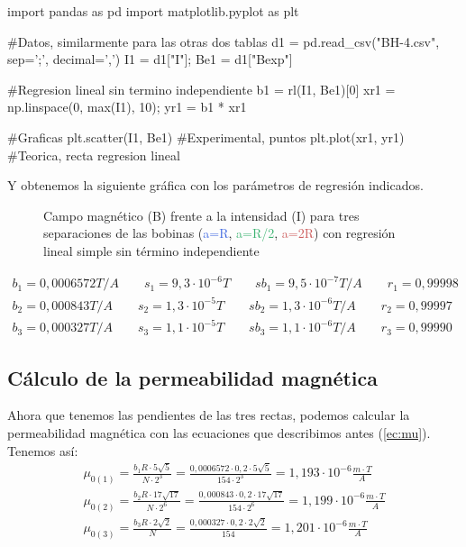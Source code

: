 \documentclass[12pt, a4paper, titlepage]{article}
\begin{document}
  \begin{python}
    import pandas as pd
    import matplotlib.pyplot as plt

    #Datos, similarmente para las otras dos tablas
    d1 = pd.read_csv("BH-4.csv", sep=';', decimal=',')
    I1 = d1["I"]; Be1 = d1["Bexp"]

    #Regresion lineal sin termino independiente
    b1 = rl(I1, Be1)[0]
    xr1 = np.linspace(0, max(I1), 10); yr1 = b1 * xr1

    #Graficas
    plt.scatter(I1, Be1) #Experimental, puntos
    plt.plot(xr1, yr1) #Teorica, recta regresion lineal
  \end{python}

  Y obtenemos la siguiente gráfica con los parámetros de regresión indicados.

  \begin{figure}[H]
    \hspace{2.5em} 
    \caption{Campo magnético (B) frente a la intensidad (I) para tres separaciones de las bobinas (\textcolor{RoyalBlue}{a=R}, \textcolor{MediumSeaGreen}{a=R/2}, \textcolor{IndianRed}{a=2R}) con regresión lineal simple sin término independiente}
  \end{figure}
  \begin{gather*}
    b_1 = 0,0006572 T/A \qquad s_1 = 9,3 \cdot 10^{-6} T \qquad sb_1 = 9,5 \cdot 10^{-7} T/A \qquad r_1 = 0,99998 \\
    b_2 = 0,000843 T/A \qquad s_2 = 1,3 \cdot 10^{-5} T \qquad sb_2 = 1,3 \cdot 10^{-6} T/A \qquad r_2 = 0,99997 \\
    b_3 = 0,000327 T/A \qquad s_3 = 1,1 \cdot 10^{-5} T \qquad sb_3 = 1,1 \cdot 10^{-6} T/A \qquad r_3 = 0,99990
  \end{gather*}

  \subsection{Cálculo de la permeabilidad magnética}

  Ahora que tenemos las pendientes de las tres rectas, podemos calcular la permeabilidad magnética con las ecuaciones que describimos antes (\ref{ec:mu}). Tenemos así:
  \begin{gather*}
    \mu_{0(1)} = \frac{b_1 R \cdot 5 \sqrt{5}}{N \cdot 2^3} = \frac{0,0006572 \cdot 0,2 \cdot 5 \sqrt{5}}{154 \cdot 2^3} = 1,193 \cdot 10^{-6} \frac{m \cdot T}{A} \\
    \mu_{0(2)} = \frac{b_2 R \cdot 17 \sqrt{17}}{N \cdot 2^6} = \frac{0,000843 \cdot 0,2 \cdot 17 \sqrt{17}}{154 \cdot 2^6} = 1,199 \cdot 10^{-6} \frac{m \cdot T}{A}\\
    \mu_{0(3)} = \frac{b_3 R \cdot 2 \sqrt{2}}{N} = \frac{0,000327 \cdot 0,2 \cdot 2 \sqrt{2}}{154} = 1,201 \cdot 10^{-6} \frac{m \cdot T}{A}
  \end{gather*}
\end{document}
